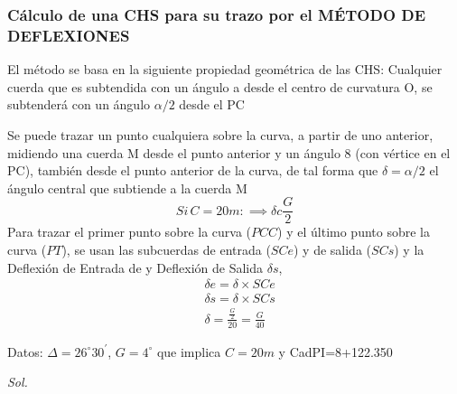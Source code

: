 \subsubsection{Cálculo de una CHS para su trazo por el MÉTODO DE DEFLEXIONES}

El método se basa en la siguiente propiedad geométrica de las CHS: Cualquier cuerda que es subtendida con un ángulo a desde el centro de curvatura O, se subtenderá con un ángulo $\alpha/2$ desde el PC

Se puede trazar un punto cualquiera sobre la curva, a partir de uno anterior, midiendo una cuerda M desde el punto anterior y un ángulo 8 (con vértice en el PC), también desde el punto anterior de la curva, de tal forma que $\delta =\alpha/2$ el ángulo central que subtiende a la cuerda M
\begin{equation*}
    Si\, C = 20 m:\implies \delta c  \frac{G}{2}
\end{equation*}
Para trazar el primer punto sobre la curva ($PCC$) y el último punto sobre la curva ($PT$), se usan las subcuerdas de entrada ($SCe$) y de salida ($SCs$) y la Deflexión de Entrada de y Deflexión de Salida $\delta s$,
\begin{align}
    &\delta e = \delta \times SCe\\
    &\delta s = \delta \times SCs\\
    &\delta = \frac{\frac{G}{2}}{20}= \frac{G}{40}
\end{align}

\begin{example}
    Datos: $\Delta= 26^{\circ}30^{\prime}$, $G=4^{\circ}$ que implica $C=20m$ y CadPI=8+122.350
\end{example}
\textit{ Sol. }

